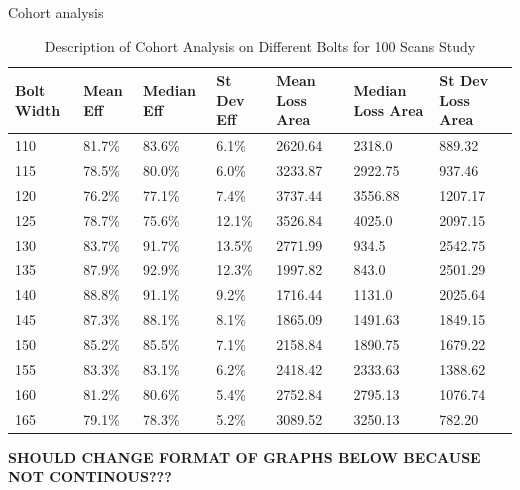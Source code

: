 Cohort analysis
\begin{table} [H]
    \centering
    \begin{tabular}{p{2cm}|p{2cm}|p{2cm}|p{2cm}|p{2cm}|p{2cm}|p{2cm}}
        \textbf{Bolt Width} & \textbf{Mean Eff} & \textbf{Median Eff} & \textbf{St Dev Eff} & \textbf{Mean Loss Area} & \textbf{Median Loss Area} & \textbf{St Dev Loss Area}\\
        \hline %
        110& 81.7\% & 83.6\% & 6.1\% & 2620.64 & 2318.0 & 889.32\\
        115& 78.5\% & 80.0\% & 6.0\% & 3233.87 & 2922.75 & 937.46\\
        120& 76.2\% & 77.1\% & 7.4\% & 3737.44 & 3556.88 & 1207.17\\
        125& 78.7\% & 75.6\% & 12.1\% & 3526.84 & 4025.0 & 2097.15\\
        130& 83.7\% & 91.7\% & 13.5\% & 2771.99 & 934.5 & 2542.75\\
        135& 87.9\% & 92.9\% & 12.3\% & 1997.82 & 843.0 & 2501.29\\
        140& 88.8\% & 91.1\% & 9.2\% & 1716.44 & 1131.0 & 2025.64\\
        145& 87.3\% & 88.1\% & 8.1\% & 1865.09 & 1491.63 & 1849.15\\
        150& 85.2\% & 85.5\% & 7.1\% & 2158.84 & 1890.75 & 1679.22\\
        155& 83.3\% & 83.1\% & 6.2\% & 2418.42 & 2333.63 & 1388.62\\
        160& 81.2\% & 80.6\% & 5.4\% & 2752.84 & 2795.13 & 1076.74\\
        165& 79.1\% & 78.3\% & 5.2\% & 3089.52 & 3250.13 & 782.20\\
        \end{tabular}
    \caption{Description of Cohort Analysis on Different Bolts for 100 Scans Study}
\end{table}
\textbf{SHOULD CHANGE FORMAT OF GRAPHS BELOW BECAUSE NOT CONTINOUS???}
